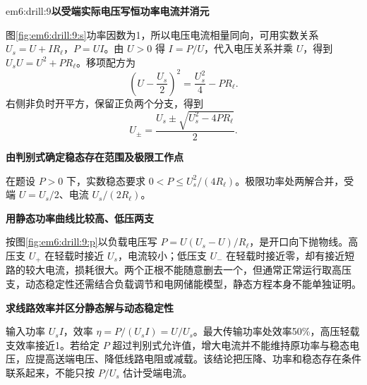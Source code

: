 \begin{drillsolution}{em6:drill:9}\textbf{以受端实际电压写恒功率电流并消元}\par\nobreak
图\ref{fig:em6:drill:9:s}功率因数为1，所以电压电流相量同向，可用实数关系 $U_s=U+IR_\ell$，$P=UI$。由 $U>0$ 得 $I=P/U$，代入电压关系并乘 $U$，得到 $U_sU=U^2+PR_\ell$。移项配方为
\[
 \left(U-\frac{U_s}{2}\right)^2=\frac{U_s^2}{4}-PR_\ell.
\]
右侧非负时开平方，保留正负两个分支，得到
\[U_\pm=\frac{U_s\pm\sqrt{U_s^2-4PR_\ell}}{2}.\]


\par\medskip{}\noindent\textbf{由判别式确定稳态存在范围及极限工作点}\par\nobreak
在题设 $P>0$ 下，实数稳态要求 $0<P\le U_s^2/(4R_\ell)$。极限功率处两解合并，受端 $U=U_s/2$、电流 $U_s/(2R_\ell)$。



\par\medskip{}\noindent\textbf{用静态功率曲线比较高、低压两支}\par\nobreak
按图\ref{fig:em6:drill:9:p}以负载电压写 $P=U(U_s-U)/R_\ell$，是开口向下抛物线。高压支 $U_+$ 在轻载时接近 $U_s$，电流较小；低压支 $U_-$ 在轻载时接近零，却有接近短路的较大电流，损耗很大。两个正根不能随意删去一个，但通常正常运行取高压支，动态稳定性还需结合负载调节和电网储能模型，静态方程本身不能单独证明。



\par\medskip{}\noindent\textbf{求线路效率并区分静态解与动态稳定性}\par\nobreak
输入功率 $U_sI$，效率 $\eta=P/(U_sI)=U/U_s$。最大传输功率处效率50\%，高压轻载支效率接近1。若给定 $P$ 超过判别式允许值，增大电流并不能维持原功率与稳态电压，应提高送端电压、降低线路电阻或减载。该结论把压降、功率和稳态存在条件联系起来，不能只按 $P/U_s$ 估计受端电流。\end{drillsolution}
